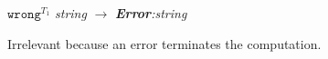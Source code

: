 \begin{case}
$\mathtt{wrong}^{T_{1}}$ \emph{string} $\rightarrow$ \emph{\textbf{Error}:\;string}

Irrelevant because an error terminates the computation.
\end{case}